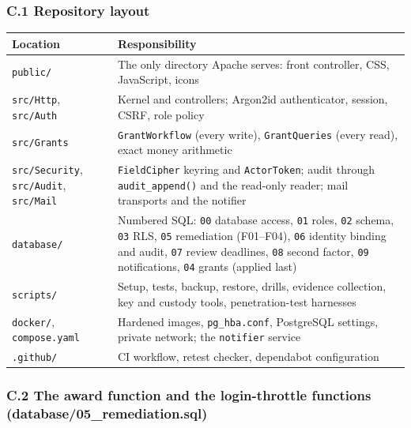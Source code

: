 \documentclass[10pt,a4paper]{article}
\newcommand{\code}[1]{\nolinkurl{#1}}
\begin{document}
\subsubsection*{C.1 Repository layout}
\begin{center}\small
\begin{tabularx}{\linewidth}{@{}L{3.4cm}Y@{}}
\toprule\textbf{Location} & \textbf{Responsibility}\\\midrule
\code{public/} & The only directory Apache serves: front controller, CSS, JavaScript, icons\\
\code{src/Http}, \code{src/Auth} & Kernel and controllers; Argon2id authenticator, session, CSRF, role policy\\
\code{src/Grants} & \code{GrantWorkflow} (every write), \code{GrantQueries} (every read), exact money arithmetic\\
\code{src/Security}, \code{src/Audit}, \code{src/Mail} & \code{FieldCipher} keyring and \code{ActorToken}; audit through \code{audit\_append()} and the read-only reader; mail transports and the notifier\\
\code{database/} & Numbered SQL: \code{00} database access, \code{01} roles, \code{02} schema, \code{03} RLS, \code{05} remediation (F01--F04), \code{06} identity binding and audit, \code{07} review deadlines, \code{08} second factor, \code{09} notifications, \code{04} grants (applied last)\\
\code{scripts/} & Setup, tests, backup, restore, drills, evidence collection, key and custody tools, penetration-test harnesses\\
\code{docker/}, \code{compose.yaml} & Hardened images, \code{pg_hba.conf}, PostgreSQL settings, private network; the \code{notifier} service\\
\code{.github/} & CI workflow, retest checker, dependabot configuration\\
\bottomrule\end{tabularx}\end{center}


\subsubsection*{C.2 The award function and the login-throttle functions (database/05\_remediation.sql)}


\end{document}
